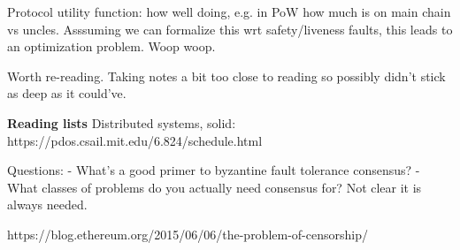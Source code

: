 \documentclass[12pt]{report}
\begin{document}
Protocol utility function: how well doing, e.g. in PoW how much is on main chain
vs uncles. Asssuming we can formalize this wrt safety/liveness faults, this
leads to an optimization problem. Woop woop.

Worth re-reading. Taking notes a bit too close to reading so possibly didn't
stick as deep as it could've.


\textbf{Reading lists}
Distributed systems, solid: https://pdos.csail.mit.edu/6.824/schedule.html


Questions:
- What's a good primer to byzantine fault tolerance consensus?
- What classes of problems do you actually need consensus for? Not clear it is always needed.


https://blog.ethereum.org/2015/06/06/the-problem-of-censorship/
\end{document}
